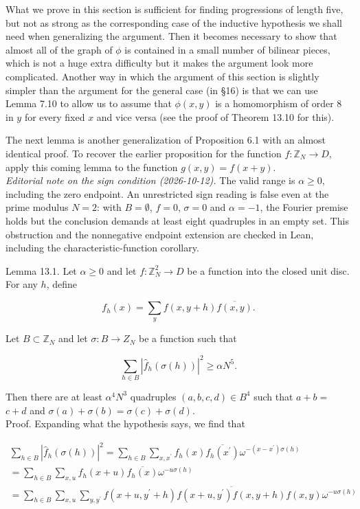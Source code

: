 \documentclass[10pt]{article}
\begin{document}
What we prove in this section is sufficient for finding progressions of length five, but not as strong as the corresponding case of the inductive hypothesis we shall need when generalizing the argument. Then it becomes necessary to show that almost all of the graph of $\phi$ is contained in a small number of bilinear pieces, which is not a huge extra difficulty but it makes the argument look more complicated. Another way in which the argument of this section is slightly simpler than the argument for the general case (in §16) is that we can use Lemma 7.10 to allow us to assume that $\phi(x, y)$ is a homomorphism of order 8 in $y$ for every fixed $x$ and vice versa (see the proof of Theorem 13.10 for this).

The next lemma is another generalization of Proposition 6.1 with an almost identical proof. To recover the earlier proposition for the function $f: \mathbb{Z}_{N} \rightarrow D$, apply this coming lemma to the function $g(x, y)=f(x+y)$.\\
\emph{Editorial note on the sign condition (2026-10-12).}
The valid range is $\alpha\geqslant0$, including the zero endpoint.
An unrestricted sign reading is false even at the prime modulus $N=2$:
with $B=\emptyset$, $f=0$, $\sigma=0$ and $\alpha=-1$, the Fourier
premise holds but the conclusion demands at least eight quadruples in
an empty set. This obstruction and the nonnegative endpoint extension
are checked in Lean, including the characteristic-function corollary.

Lemma 13.1. Let $\alpha\geqslant0$ and let $f: \mathbb{Z}_{N}^{2} \rightarrow D$ be a function into the closed unit disc. For any $h$, define

$$
f_{h}(x)=\sum_{y} f(x, y+h) \overline{f(x, y)} .
$$

Let $B \subset \mathbb{Z}_{N}$ and let $\sigma: B \rightarrow Z_{N}$ be a function such that

$$
\sum_{h \in B}\left|\hat{f}_{h}(\sigma(h))\right|^{2} \geqslant \alpha N^{5} .
$$

Then there are at least $\alpha^{4} N^{3}$ quadruples $(a, b, c, d) \in B^{4}$ such that $a+b=$ $c+d$ and $\sigma(a)+\sigma(b)=\sigma(c)+\sigma(d)$.\\
Proof. Expanding what the hypothesis says, we find that

$$
\begin{gathered}
\sum_{h \in B}\left|\hat{f}_{h}(\sigma(h))\right|^{2}=\sum_{h \in B} \sum_{x, x^{\prime}} f_{h}(x) \overline{f_{h}\left(x^{\prime}\right)} \omega^{-\left(x-x^{\prime}\right) \sigma(h)} \\
=\sum_{h \in B} \sum_{x, u} f_{h}(x+u) \overline{f_{h}(x)} \omega^{-u \sigma(h)} \\
=\sum_{h \in B} \sum_{x, u} \sum_{y, y^{\prime}} f\left(x+u, y^{\prime}+h\right) \overline{f\left(x+u, y^{\prime}\right) f(x, y+h)} f(x, y) \omega^{-u \sigma(h)}
\end{gathered}
$$
\end{document}
